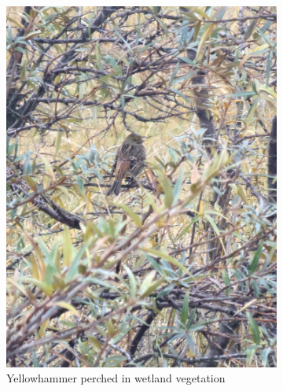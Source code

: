 \documentclass[twocolumn]{article}
\begin{document}
\begin{figure}[h]
\begin{subfigure}{0.31\textwidth}
\centering
\includegraphics[width=\textwidth]{05_camouflaged_bird_vegetation.jpg}
\caption{Yellowhammer perched in wetland vegetation}
\end{subfigure}
\hfill
\begin{subfigure}{0.31\textwidth}
\centering

\end{subfigure}
\end{figure}
\end{document}
